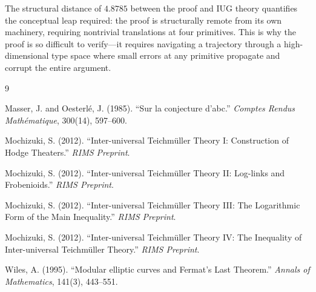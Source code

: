 \documentclass[12pt]{article}
\begin{document}
The structural distance of $4.8785$ between the proof and IUG theory quantifies the conceptual leap required: the proof is structurally remote from its own machinery, requiring nontrivial translations at four primitives. This is why the proof is so difficult to verify---it requires navigating a trajectory through a high-dimensional type space where small errors at any primitive propagate and corrupt the entire argument.

\begin{thebibliography}{9}

Masser, J. and Oesterl\'e, J. (1985). ``Sur la conjecture d'abc.'' \textit{Comptes Rendus Math\'ematique}, 300(14), 597--600.

Mochizuki, S. (2012). ``Inter-universal Teichm\"uller Theory I: Construction of Hodge Theaters.'' \textit{RIMS Preprint}.

Mochizuki, S. (2012). ``Inter-universal Teichm\"uller Theory II: Log-links and Frobenioids.'' \textit{RIMS Preprint}.

Mochizuki, S. (2012). ``Inter-universal Teichm\"uller Theory III: The Logarithmic Form of the Main Inequality.'' \textit{RIMS Preprint}.

Mochizuki, S. (2012). ``Inter-universal Teichm\"uller Theory IV: The Inequality of Inter-universal Teichm\"uller Theory.'' \textit{RIMS Preprint}.

Wiles, A. (1995). ``Modular elliptic curves and Fermat's Last Theorem.'' \textit{Annals of Mathematics}, 141(3), 443--551.

\end{thebibliography}
\end{document}
